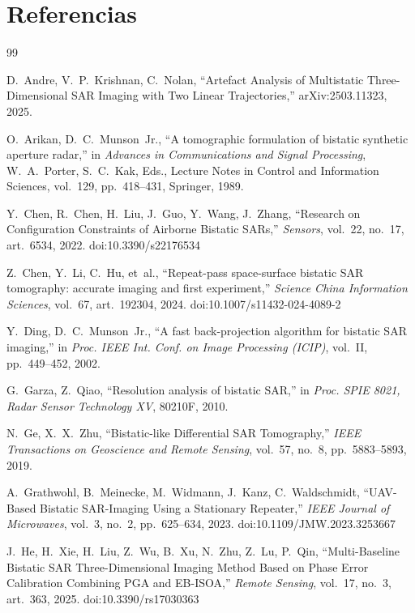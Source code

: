 \documentclass[11pt,a4paper]{article}
\begin{document}
\section*{Referencias}

\begin{thebibliography}{99}

 D.~Andre, V.~P.~Krishnan, C.~Nolan, ``Artefact Analysis of Multistatic Three-Dimensional SAR Imaging with Two Linear Trajectories,'' arXiv:2503.11323, 2025.

 O.~Arikan, D.~C.~Munson~Jr., ``A tomographic formulation of bistatic synthetic aperture radar,'' in \emph{Advances in Communications and Signal Processing}, W.~A.~Porter, S.~C.~Kak, Eds., Lecture Notes in Control and Information Sciences, vol.~129, pp.~418--431, Springer, 1989.

 Y.~Chen, R.~Chen, H.~Liu, J.~Guo, Y.~Wang, J.~Zhang, ``Research on Configuration Constraints of Airborne Bistatic SARs,'' \emph{Sensors}, vol.~22, no.~17, art.~6534, 2022. doi:10.3390/s22176534

 Z.~Chen, Y.~Li, C.~Hu, et~al., ``Repeat-pass space-surface bistatic SAR tomography: accurate imaging and first experiment,'' \emph{Science China Information Sciences}, vol.~67, art.~192304, 2024. doi:10.1007/s11432-024-4089-2

 Y.~Ding, D.~C.~Munson~Jr., ``A fast back-projection algorithm for bistatic SAR imaging,'' in \emph{Proc. IEEE Int. Conf. on Image Processing (ICIP)}, vol.~II, pp.~449--452, 2002.

 G.~Garza, Z.~Qiao, ``Resolution analysis of bistatic SAR,'' in \emph{Proc. SPIE 8021, Radar Sensor Technology XV}, 80210F, 2010.

 N.~Ge, X.~X.~Zhu, ``Bistatic-like Differential SAR Tomography,'' \emph{IEEE Transactions on Geoscience and Remote Sensing}, vol.~57, no.~8, pp.~5883--5893, 2019.

 A.~Grathwohl, B.~Meinecke, M.~Widmann, J.~Kanz, C.~Waldschmidt, ``UAV-Based Bistatic SAR-Imaging Using a Stationary Repeater,'' \emph{IEEE Journal of Microwaves}, vol.~3, no.~2, pp.~625--634, 2023. doi:10.1109/JMW.2023.3253667

 J.~He, H.~Xie, H.~Liu, Z.~Wu, B.~Xu, N.~Zhu, Z.~Lu, P.~Qin, ``Multi-Baseline Bistatic SAR Three-Dimensional Imaging Method Based on Phase Error Calibration Combining PGA and EB-ISOA,'' \emph{Remote Sensing}, vol.~17, no.~3, art.~363, 2025. doi:10.3390/rs17030363


\end{thebibliography}
\end{document}
